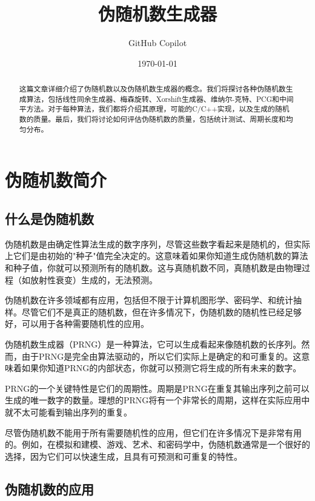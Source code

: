 \documentclass{ctexart}
\title{伪随机数生成器}
\author{GitHub Copilot}
\date{\today}
\begin{document}
\maketitle

\begin{abstract}
这篇文章详细介绍了伪随机数以及伪随机数生成器的概念。我们将探讨各种伪随机数生成算法，包括线性同余生成器、梅森旋转、Xorshift生成器、维纳尔-克特、PCG和中间平方法。对于每种算法，我们都将介绍其原理，可能的C/C++实现，以及生成的随机数的质量。最后，我们将讨论如何评估伪随机数的质量，包括统计测试、周期长度和均匀分布。
\end{abstract}

\section{伪随机数简介}
    \subsection{什么是伪随机数}

    伪随机数是由确定性算法生成的数字序列，尽管这些数字看起来是随机的，但实际上它们是由初始的"种子"值完全决定的。这意味着如果你知道生成伪随机数的算法和种子值，你就可以预测所有的随机数。这与真随机数不同，真随机数是由物理过程（如放射性衰变）生成的，无法预测\cite{knuth1981art}。

    伪随机数在许多领域都有应用，包括但不限于计算机图形学、密码学、和统计抽样。尽管它们不是真正的随机数，但在许多情况下，伪随机数的随机性已经足够好，可以用于各种需要随机性的应用\cite{lecuyer1999uniform}。

    伪随机数生成器（PRNG）是一种算法，它可以生成看起来像随机数的长序列。然而，由于PRNG是完全由算法驱动的，所以它们实际上是确定的和可重复的。这意味着如果你知道PRNG的内部状态，你就可以预测它将生成的所有未来的数字。

    PRNG的一个关键特性是它们的周期性。周期是PRNG在重复其输出序列之前可以生成的唯一数字的数量。理想的PRNG将有一个非常长的周期，这样在实际应用中就不太可能看到输出序列的重复。

    尽管伪随机数不能用于所有需要随机性的应用，但它们在许多情况下是非常有用的。例如，在模拟和建模、游戏、艺术、和密码学中，伪随机数通常是一个很好的选择，因为它们可以快速生成，且具有可预测和可重复的特性。
    
    \subsection{伪随机数的应用}
\end{document}
